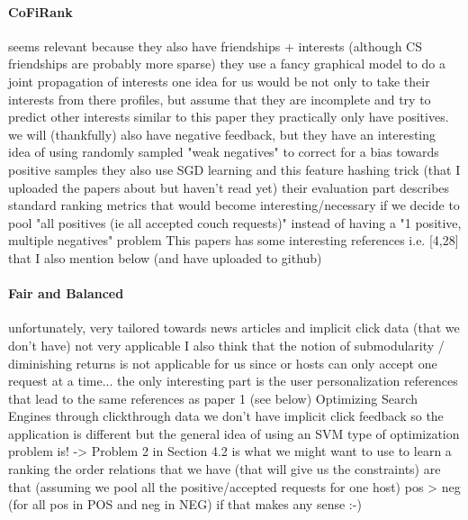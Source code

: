 \documentclass[11pt]{article}
\begin{document}
\paragraph{CoFiRank} \cite{Weimer2009}
seems relevant because they also have friendships + interests (although CS friendships are probably more sparse)
they use a fancy graphical model to do a joint propagation of interests
one idea for us would be not only to take their interests from there profiles, but assume that they are incomplete and try to predict other interests similar to this paper
they practically only have positives. we will (thankfully) also have negative feedback, but they have an interesting idea of using randomly sampled "weak negatives" to correct for a bias towards positive samples
they also use SGD learning and this feature hashing trick (that I uploaded the papers about but haven't read yet)
their evaluation part describes standard ranking metrics that would become interesting/necessary if we decide to pool "all positives (ie all accepted couch requests)" instead of having a "1 positive, multiple negatives" problem
This papers has some interesting references i.e. [4,28] that I also mention below (and have uploaded to github)

\paragraph{Fair and Balanced} \cite{Ahmed2012}
unfortunately, very tailored towards news articles and implicit click data (that we don't have)  not very applicable
I also think that the notion of submodularity / diminishing returns is not applicable for us since or hosts can only accept one request at a time...
the only interesting part is the user personalization references that lead to the same references as paper 1 (see below)
Optimizing Search Engines through clickthrough data
we don't have implicit click feedback so the application is different but the general idea of using an SVM type of optimization problem is!
-> Problem 2 in Section 4.2 is what we might want to use to learn a ranking
the order relations that we have (that will give us the constraints) are that (assuming we pool all the positive/accepted requests for one host) pos > neg (for all pos in POS and neg in NEG) if that makes any sense :-)
\end{document}
